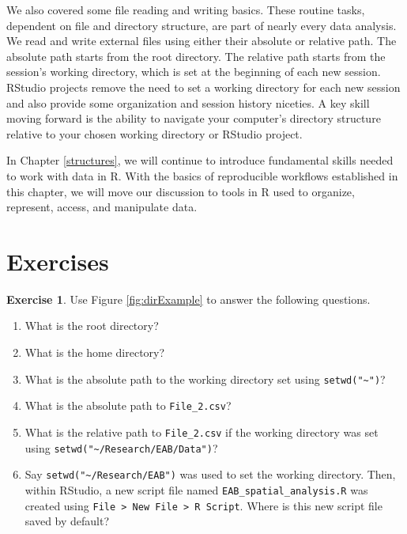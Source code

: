 \documentclass[
  11pt,
]{krantz}
\theoremstyle{definition}
\theoremstyle{definition}
\theoremstyle{definition}
\newtheorem{exercise}{Exercise}[chapter]
\theoremstyle{definition}
\theoremstyle{remark}
\begin{document}
We also covered some file reading and writing basics. These routine tasks, dependent on file and directory structure, are part of nearly every data analysis. We read and write external files using either their absolute or relative path. The absolute path starts from the root directory. The relative path starts from the session's working directory, which is set at the beginning of each new session. RStudio projects remove the need to set a working directory for each new session and also provide some organization and session history niceties. A key skill moving forward is the ability to navigate your computer's directory structure relative to your chosen working directory or RStudio project.

In Chapter \ref{structures}, we will continue to introduce fundamental skills needed to work with data in R. With the basics of reproducible workflows established in this chapter, we will move our discussion to tools in R used to organize, represent, access, and manipulate data.

\hypertarget{exercisesWorkflow}{%
\section{Exercises}\label{exercisesWorkflow}}

\begin{exercise}
\protect\hypertarget{exr:workflow1}{}\label{exr:workflow1}Use Figure \ref{fig:dirExample} to answer the following questions.
\end{exercise}

\begin{enumerate}
\def\labelenumi{\alph{enumi}.}
\item
  What is the root directory?
\item
  What is the home directory?
\item
  What is the absolute path to the working directory set using \texttt{setwd("\textasciitilde{}")}?
\item
  What is the absolute path to \texttt{File\_2.csv}?
\item
  What is the relative path to \texttt{File\_2.csv} if the working directory was set using \texttt{setwd("\textasciitilde{}/Research/EAB/Data")}?
\item
  Say \texttt{setwd("\textasciitilde{}/Research/EAB")} was used to set the working directory. Then, within RStudio, a new script file named \texttt{EAB\_spatial\_analysis.R} was created using \texttt{File\ \textgreater{}\ New\ File\ \textgreater{}\ R\ Script}. Where is this new script file saved by default?
\end{enumerate}
\end{document}
